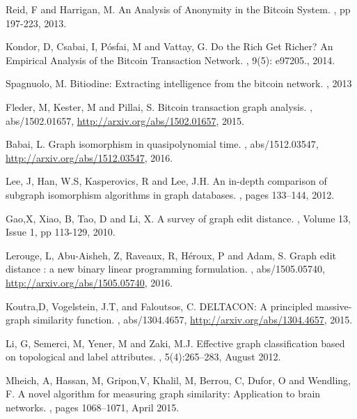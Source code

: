 \begin{thebibliography}{99}
 Reid, F and Harrigan, M.
\newblock An Analysis of Anonymity in the Bitcoin System.
, pp 197-223, 2013.

 Kondor, D, Csabai, I, P{\'{o}}sfai, M and Vattay,  G.
\newblock Do the Rich Get Richer? An Empirical Analysis of the Bitcoin Transaction Network. 
, 9(5): e97205., 2014.

 Spagnuolo, M. 
\newblock Bitiodine: Extracting intelligence from the bitcoin network. 
, 2013

 Fleder, M, Kester, M and Pillai, S.
\newblock Bitcoin transaction graph analysis. 
, abs/1502.01657,
\newblock \url {http://arxiv.org/abs/1502.01657}, 2015.

 Babai, L. 
\newblock  Graph isomorphism in quasipolynomial time. 
, abs/1512.03547, 
\newblock \url {http://arxiv.org/abs/1512.03547}, 2016.

 Lee, J, Han, W.S, Kasperovics, R and Lee, J.H.
\newblock  An in-depth comparison of subgraph isomorphism algorithms in graph databases. 
, pages 133–144, 2012.

 Gao,X, Xiao, B, Tao, D and Li, X.
\newblock A survey of graph edit distance.
, Volume 13, Issue 1, pp 113-129, 2010.

 Lerouge, L, Abu{-}Aisheh, Z, Raveaux, R, H{\'{e}}roux, P and Adam, S.
\newblock Graph edit distance : a new binary linear programming formulation.
, abs/1505.05740, 
\newblock \url {http://arxiv.org/abs/1505.05740}, 2016.

 Koutra,D, Vogelstein, J.T, and Faloutsos, C.
\newblock  DELTACON: A principled massive-graph similarity function. 
, abs/1304.4657,
\newblock \url {http://arxiv.org/abs/1304.4657}, 2015.


 Li, G, Semerci, M, Yener, M and Zaki, M.J. 
\newblock Effective graph classification based on topological and label attributes.
, 5(4):265–283, August 2012.

 Mheich, A, Hassan, M, Gripon,V,  Khalil, M,  Berrou, C, Dufor, O and Wendling, F.
\newblock  A novel algorithm for measuring graph similarity:
Application to brain networks. 
, pages 1068–1071, April 2015.


\end{thebibliography}
